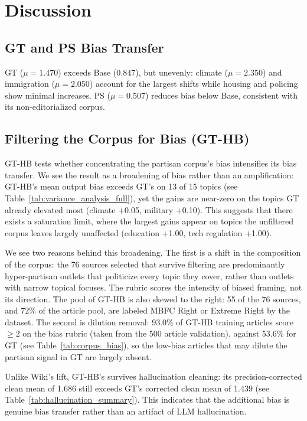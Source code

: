 \documentclass[11pt]{article}
\begin{document}
\section{Discussion}

\subsection{GT and PS Bias Transfer}

GT ($\mu=1.470$) exceeds Base ($0.847$), but unevenly: climate ($\mu=2.350$) and immigration ($\mu=2.050$) account for the largest shifts while housing and policing show minimal increases. PS ($\mu=0.507$) reduces bias below Base, consistent with its non-editorialized corpus.

\subsection{Filtering the Corpus for Bias (GT-HB)}

GT-HB tests whether concentrating the partisan corpus's bias intensifies its bias transfer.
We see the result as a broadening of bias rather than an amplification: GT-HB's mean output bias exceeds GT's on 13 of 15 topics (see Table~\ref{tab:variance_analysis_full}), yet the gains are near-zero on the topics GT already elevated most (climate +0.05, military +0.10).  
This suggests that there exists a saturation limit, where the largest gains appear on topics the unfiltered corpus leaves largely unaffected (education +1.00, tech regulation +1.00).

We see two reasons behind this broadening.
The first is a shift in the composition of the corpus: the 76 sources selected that survive filtering are predominantly hyper-partisan outlets that politicize every topic they cover, rather than outlets with narrow topical focuses.
The rubric scores the intensity of biased framing, not its direction.
The pool of GT-HB is also skewed to the right: 55 of the 76 sources, and $72\%$ of the article pool, are labeled MBFC Right or Extreme Right by the dataset.
The second is dilution removal: 93.0\% of GT-HB training articles score $\geq 2$ on the bias rubric (taken from the 500 article validation), against 53.6\% for GT (see Table~\ref{tab:corpus_bias}), so the low-bias articles that may dilute the partisan signal in GT are largely absent.

Unlike Wiki's lift, GT-HB's survives hallucination cleaning: its precision-corrected clean mean of 1.686 still exceeds GT's corrected clean mean of 1.439 (see Table~\ref{tab:hallucination_summary}).
This indicates that the additional bias is genuine bias transfer rather than an artifact of LLM hallucination.
\end{document}
